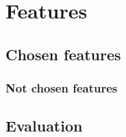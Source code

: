 \section{Features}
\subsection{Chosen features}
\subsubsection{Not chosen features}
\subsection{Evaluation}
